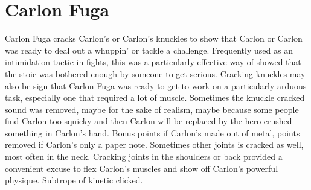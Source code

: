 \documentclass[12pt]{book}
\begin{document}
\chapter{Carlon Fuga}

Carlon Fuga cracks Carlon's or Carlon's knuckles to show that Carlon or Carlon was ready to deal out a whuppin' or tackle a challenge. Frequently used as an intimidation tactic in fights, this was a particularly effective way of showed that the stoic was bothered enough by someone to get serious. Cracking knuckles may also be sign that Carlon Fuga was ready to get to work on a particularly arduous task, especially one that required a lot of muscle. Sometimes the knuckle cracked sound was removed, maybe for the sake of realism, maybe because some people find Carlon too squicky and then Carlon will be replaced by the hero crushed something in Carlon's hand. Bonus points if Carlon's made out of metal, points removed if Carlon's only a paper note. Sometimes other joints is cracked as well, most often in the neck. Cracking joints in the shoulders or back provided a convenient excuse to flex Carlon's muscles and show off Carlon's powerful physique. Subtrope of kinetic clicked.
\end{document}
